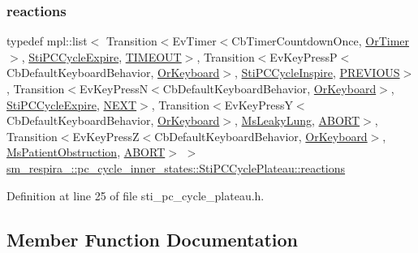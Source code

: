 \subsubsection{\texorpdfstring{reactions}{reactions}}
{\footnotesize\ttfamily typedef mpl\+::list$<$ Transition$<$Ev\+Timer$<$Cb\+Timer\+Countdown\+Once, \hyperlink{classsm__respira__1_1_1OrTimer}{Or\+Timer}$>$, \hyperlink{structsm__respira__1_1_1pc__cycle__inner__states_1_1StiPCCycleExpire}{Sti\+P\+C\+Cycle\+Expire}, \hyperlink{structsm__respira__1_1_1pc__cycle__inner__states_1_1StiPCCyclePlateau_1_1TIMEOUT}{T\+I\+M\+E\+O\+UT}$>$, Transition$<$Ev\+Key\+PressP$<$Cb\+Default\+Keyboard\+Behavior, \hyperlink{classsm__respira__1_1_1OrKeyboard}{Or\+Keyboard}$>$, \hyperlink{structsm__respira__1_1_1pc__cycle__inner__states_1_1StiPCCycleInspire}{Sti\+P\+C\+Cycle\+Inspire}, \hyperlink{structsm__respira__1_1_1pc__cycle__inner__states_1_1StiPCCyclePlateau_1_1PREVIOUS}{P\+R\+E\+V\+I\+O\+US}$>$, Transition$<$Ev\+Key\+PressN$<$Cb\+Default\+Keyboard\+Behavior, \hyperlink{classsm__respira__1_1_1OrKeyboard}{Or\+Keyboard}$>$, \hyperlink{structsm__respira__1_1_1pc__cycle__inner__states_1_1StiPCCycleExpire}{Sti\+P\+C\+Cycle\+Expire}, \hyperlink{structsm__respira__1_1_1pc__cycle__inner__states_1_1StiPCCyclePlateau_1_1NEXT}{N\+E\+XT}$>$, Transition$<$Ev\+Key\+PressY$<$Cb\+Default\+Keyboard\+Behavior, \hyperlink{classsm__respira__1_1_1OrKeyboard}{Or\+Keyboard}$>$, \hyperlink{classsm__respira__1_1_1MsLeakyLung}{Ms\+Leaky\+Lung}, \hyperlink{classABORT}{A\+B\+O\+RT}$>$, Transition$<$Ev\+Key\+PressZ$<$Cb\+Default\+Keyboard\+Behavior, \hyperlink{classsm__respira__1_1_1OrKeyboard}{Or\+Keyboard}$>$, \hyperlink{classsm__respira__1_1_1MsPatientObstruction}{Ms\+Patient\+Obstruction}, \hyperlink{classABORT}{A\+B\+O\+RT}$>$ $>$ \hyperlink{structsm__respira__1_1_1pc__cycle__inner__states_1_1StiPCCyclePlateau_a0c51f165d5ab7bc19d821cb2d9b7154d}{sm\+\_\+respira\+\_\+::pc\+\_\+cycle\+\_\+inner\+\_\+states\+::\+Sti\+P\+C\+Cycle\+Plateau\+::reactions}}



Definition at line 25 of file sti\+\_\+pc\+\_\+cycle\+\_\+plateau.\+h.



\subsection{Member Function Documentation}
\mbox{\label{structsm__respira__1_1_1pc__cycle__inner__states_1_1StiPCCyclePlateau_ad86b1d986fb646c126b7c35473471184}} 
